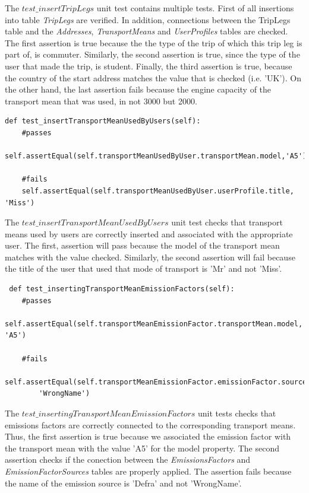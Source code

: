 The $test\_insertTripLegs$ unit test contains multiple tests. First of all insertions into table \emph{TripLegs} are verified. In addition, connections between the TripLegs table and the \emph{Addresses}, \emph{TransportMeans} and \emph{UserProfiles} tables are checked. The first assertion is true because the the type of the trip of which this trip leg is part of, is commuter. Similarly, the second assertion is true, since the type of the user that made the trip, is student. Finally, the third assertion is true, because the country of the start address matches the value that is checked (i.e. 'UK'). On the other hand, the last assertion fails because the engine capacity of the transport mean that was used, in not 3000 but 2000.

\begin{verbatim}
def test_insertTransportMeanUsedByUsers(self):
    #passes
    self.assertEqual(self.transportMeanUsedByUser.transportMean.model,'A5')

    #fails
    self.assertEqual(self.transportMeanUsedByUser.userProfile.title, 'Miss')
\end{verbatim}

The $test\_insertTransportMeanUsedByUsers$ unit test checks that transport means used by users are correctly inserted and associated with the appropriate user. The first, assertion will pass because the model of the transport mean matches with the value checked. Similarly, the second assertion will fail because the title of the user that used that mode of transport is 'Mr' and not 'Miss'.

\begin{verbatim}
 def test_insertingTransportMeanEmissionFactors(self):
    #passes
    self.assertEqual(self.transportMeanEmissionFactor.transportMean.model, 'A5')

    #fails
    self.assertEqual(self.transportMeanEmissionFactor.emissionFactor.source.name,
        'WrongName')
\end{verbatim}

The $test\_insertingTransportMeanEmissionFactors$ unit tests checks that emissions factors are correctly connected to the corresponding transport means. Thus, the first assertion is true because we associated the emission factor with the transport mean with the value 'A5' for the model property. The second assertion checks if the conection between the \emph{EmissionsFactors}  and \emph{EmissionFactorSources} tables are properly applied. The assertion fails because the name of the emission source is 'Defra' and not 'WrongName'.

